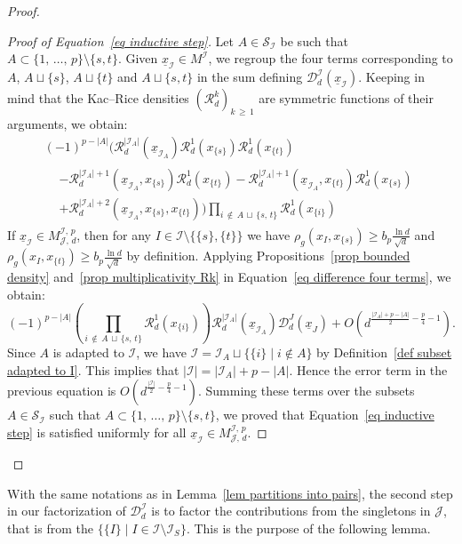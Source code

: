 \documentclass[AHL,Unicode,longabstracts,published]{cedram}
\newcommand{\D}{\mathcal{D}}
\newcommand{\I}{\mathcal{I}}
\newcommand{\J}{\mathcal{J}}
\newcommand{\clR}{\mathcal{R}}
\newcommand{\clS}{\mathcal{S}}
\newcommand{\norm}[1]{\left\lvert #1 \right\rvert}
\renewcommand{\geq}{\geqslant}
\begin{document}
\begin{proof}
\begin{proof}[{Proof of Equation~\eqref{eq inductive step}}]
Let $A \in \clS_\I$ be such that $A \subset \{1,\,\dots,\,p\} \setminus \{s,t\}$. Given $\underline{x}_\I \in M^\I$, we regroup the four terms corresponding to $A$, $A \sqcup \{s\}$, $A \sqcup \{t\}$ and $A \sqcup \{s,t\}$ in the sum defining $\D_d^\I(\underline{x}_\I)$. Keeping in mind that the Kac--Rice densities $(\clR_d^k)_{k\,\geq\,1}$ are symmetric functions of their arguments, we obtain:
\begin{multline}\label{eq difference four terms}
(-1)^{p-\norm{A}} \bigg(\clR_d^{\norm{\I_A}}\left(\underline{x}_{\I_A}\right)\clR^1_d\left(x_{\{s\}}\right)\clR^1_d\left(x_{\{t\}}\right)\\
\begin{aligned}
&- \clR_d^{\norm{\I_A}+1}\left(\underline{x}_{\I_A},x_{\{s\}}\right)\clR^1_d\left(x_{\{t\}}\right)
- \clR_d^{\norm{\I_A}+1}\left(\underline{x}_{\I_A},x_{\{t\}}\right)\clR^1_d\left(x_{\{s\}}\right)\\
& + \clR_d^{\norm{\I_A}+2}\left(\underline{x}_{\I_A},x_{\{s\}},x_{\{t\}}\right) \bigg) \prod_{i\,\notin\,A\,\sqcup\,\{s,\,t\}} \clR^1_d\left(x_{\{i\}}\right)
\end{aligned}
\end{multline}
If $\underline{x}_\I \in M^{\I,\,p}_{\J,\,d}$, then for any $I \in \I \setminus \{\{s\},\{t\}\}$ we have $\rho_g(x_I,x_{\{s\}}) \geq b_p\tfrac{\ln d}{\sqrt{d}}$ and $\rho_g(x_I,x_{\{t\}}) \geq b_p\tfrac{\ln d}{\sqrt{d}}$ by definition. Applying Propositions~\ref{prop bounded density} and~\ref{prop multiplicativity Rk} in Equation~\eqref{eq difference four terms}, we obtain:
\[
(-1)^{p-\norm{A}} \left(\prod_{i\,\notin\,A\,\sqcup\,\{s,\,t\}} \clR^1_d\left(x_{\{i\}}\right)\right)\clR_d^{\norm{\I_A}}\left(\underline{x}_{\I_A}\right) \D_d^J\left(\underline{x}_J\right)+O\!\left(d^{\frac{\norm{\I_A}+p-\norm{A}}{2}-\frac{p}{4}-1}\right).
\]
Since $A$ is adapted to $\I$, we have $\I = \I_A \sqcup \{\{i\} \mid i \notin A\}$ by Definition~\ref{def subset adapted to I}. This implies that $|\I| =|\I_A| +p - |A|$. Hence the error term in the previous equation is $O(d^{\frac{|\I|}{2}-\frac{p}{4}-1})$. Summing these terms over the subsets $A \in \clS_\I$ such that $A \subset \{1,\,\dots,\,p\} \setminus \{s,t\}$, we proved that Equation~\eqref{eq inductive step} is satisfied uniformly for all $\underline{x}_\I \in M^{\I,\,p}_{\J,\,d}$.
\end{proof}\let\qed\relax
\end{proof}

With the same notations as in Lemma~\ref{lem partitions into pairs}, the second step in our factorization of $\D^\I_d$ is to factor the contributions from the singletons in $\J$, that is from the $\{\{I\} \mid I \in \I \setminus \I_S\}$. This is the purpose of the following lemma.
\end{document}
